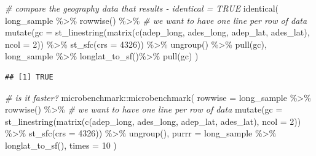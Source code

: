\documentclass[
]{book}
\newenvironment{Shaded}{\begin{snugshade}}{\end{snugshade}}
\newcommand{\AttributeTok}[1]{\textcolor[rgb]{0.77,0.63,0.00}{#1}}
\newcommand{\CommentTok}[1]{\textcolor[rgb]{0.56,0.35,0.01}{\textit{#1}}}
\newcommand{\DecValTok}[1]{\textcolor[rgb]{0.00,0.00,0.81}{#1}}
\newcommand{\FunctionTok}[1]{\textcolor[rgb]{0.00,0.00,0.00}{#1}}
\newcommand{\NormalTok}[1]{#1}
\newcommand{\SpecialCharTok}[1]{\textcolor[rgb]{0.00,0.00,0.00}{#1}}
\begin{document}
\begin{Shaded}
\begin{Highlighting}[]
\CommentTok{\# compare the geography data that results {-} identical = TRUE}
\FunctionTok{identical}\NormalTok{(}
\NormalTok{  long\_sample }\SpecialCharTok{\%\textgreater{}\%} 
    \FunctionTok{rowwise}\NormalTok{() }\SpecialCharTok{\%\textgreater{}\%} \CommentTok{\# we want to have one line per row of data}
    \FunctionTok{mutate}\NormalTok{(}\AttributeTok{gc =} \FunctionTok{st\_linestring}\NormalTok{(}\FunctionTok{matrix}\NormalTok{(}\FunctionTok{c}\NormalTok{(adep\_long, ades\_long, adep\_lat, ades\_lat), }
                                     \AttributeTok{ncol =} \DecValTok{2}\NormalTok{)) }\SpecialCharTok{\%\textgreater{}\%} 
             \FunctionTok{st\_sfc}\NormalTok{(}\AttributeTok{crs =} \DecValTok{4326}\NormalTok{)) }\SpecialCharTok{\%\textgreater{}\%} 
    \FunctionTok{ungroup}\NormalTok{() }\SpecialCharTok{\%\textgreater{}\%} 
    \FunctionTok{pull}\NormalTok{(gc),}
\NormalTok{  long\_sample }\SpecialCharTok{\%\textgreater{}\%} 
    \FunctionTok{longlat\_to\_sf}\NormalTok{()}\SpecialCharTok{\%\textgreater{}\%} 
    \FunctionTok{pull}\NormalTok{(gc)}
\NormalTok{)}
\end{Highlighting}
\end{Shaded}

\begin{verbatim}
## [1] TRUE
\end{verbatim}

\begin{Shaded}
\begin{Highlighting}[]
\CommentTok{\# is it faster?}
\NormalTok{microbenchmark}\SpecialCharTok{::}\FunctionTok{microbenchmark}\NormalTok{(}
  \AttributeTok{rowwise =}\NormalTok{ long\_sample }\SpecialCharTok{\%\textgreater{}\%} 
    \FunctionTok{rowwise}\NormalTok{() }\SpecialCharTok{\%\textgreater{}\%} \CommentTok{\# we want to have one line per row of data}
    \FunctionTok{mutate}\NormalTok{(}\AttributeTok{gc =} \FunctionTok{st\_linestring}\NormalTok{(}\FunctionTok{matrix}\NormalTok{(}\FunctionTok{c}\NormalTok{(adep\_long, ades\_long, adep\_lat, ades\_lat), }
                                     \AttributeTok{ncol =} \DecValTok{2}\NormalTok{)) }\SpecialCharTok{\%\textgreater{}\%} 
             \FunctionTok{st\_sfc}\NormalTok{(}\AttributeTok{crs =} \DecValTok{4326}\NormalTok{)) }\SpecialCharTok{\%\textgreater{}\%} 
    \FunctionTok{ungroup}\NormalTok{(),}
  \AttributeTok{purrr =}\NormalTok{ long\_sample }\SpecialCharTok{\%\textgreater{}\%} 
    \FunctionTok{longlat\_to\_sf}\NormalTok{(),}
  \AttributeTok{times =} \DecValTok{10}
\NormalTok{)}
\end{Highlighting}
\end{Shaded}
\end{document}
